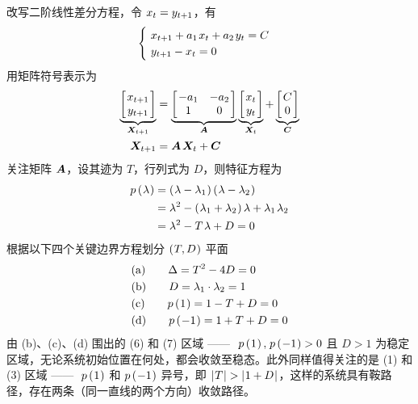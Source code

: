 改写二阶线性差分方程，令 \(x_t=y_{t+1}\)，有
\begin{equation*}
    \begin{cases}
        \ x\nt + a_1\,x_t + a_2\,y_t = C\\
        \ y\nt - x_t = 0
    \end{cases}
\end{equation*}
用矩阵符号表示为
\begin{align}
    \underbrace{\matbks{x\nt\\y\nt}}_{\bs X\nt}&=\underbrace{\matbks{-a_1 & -a_2\\1 & 0}}_{\bs A}\underbrace{\matbks{x_t\\y_t}}_{\bs X_t}+\underbrace{\matbks{C\\0}}_{\bs C}\\
    \bsX\nt&=\bsA\,\bsX_t+\bs C\label{eq:DiffEquMatrix}
\end{align}
关注矩阵 \(\bm{A}\)，设其迹为 \(T\)，行列式为 \(D\)，则特征方程为
\begin{align*}
    p\bka\lambda&=\bka{\lambda-\lambda_1}\bka{\lambda-\lambda_2}\\
    &= \lambda^2 - \bka{\lambda_1+\lambda_2}\lambda + \lambda_1\,\lambda_2\\
    &= \lambda^2 - T\,\lambda + D=0
\end{align*}
根据以下四个关键边界方程划分 \(\left(\mspace{1mu} T,D\mspace{1mu}\right)\) 平面
\begin{align*}
    &(\text{a})\qquad \Delta=T^2-4D=0\\
    &(\text{b})\qquad D=\lambda_1\cdot\lambda_2=1\\
    &(\text{c})\qquad p\left(\mspace{1mu}1\mspace{1mu}\right)=1-T+D=0\\
    &(\text{d})\qquad p\left(\mspace{1mu}-1\mspace{1mu}\right)=1+T+D=0
\end{align*}
由 (b)、(c)、(d) 围出的 (6) 和 (7) 区域 —— \( \ p\bka{1},\,p\bka{-1}>0\) 且 \(D>1\) 为稳定区域，无论系统初始位置在何处，都会收敛至稳态。此外同样值得关注的是 (1) 和 (3) 区域 —— \( \ p\left(\mspace{1mu}1\mspace{1mu}\right)\) 和 \(p\left(\mspace{1mu}-1\mspace{1mu}\right)\) 异号，即 \(\bkf T>\bkf{1+D}\)，这样的系统具有鞍路径，存在两条（同一直线的两个方向）收敛路径。

